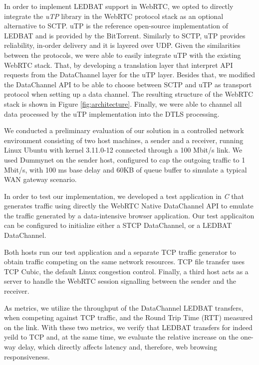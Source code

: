 \documentclass{sig-alternate}
\begin{document}
In order to implement LEDBAT support in WebRTC, we opted to directly integrate the
\textit{uTP} library \cite{utp-repo} in the WebRTC protocol stack as an optional
alternative to SCTP. uTP is the reference open-source implementation of LEDBAT and is
provided by the BitTorrent. Similarly to SCTP, uTP provides reliability, in-order delivery
and it is layered over UDP. Given the similarities between the protocols, we were able to
easily integrate uTP with the existing WebRTC stack. That, by developing a translation
layer that interpret API requests from the DataChannel layer for the uTP layer. Besides
that, we modified the DataChannel API to be able to choose between SCTP and uTP as
transport protocol when setting up a data channel. The resulting structure of the WebRTC
stack is shown in Figure \ref{fig:architecture}. Finally, we were able to channel all data
processed by the uTP implementation into the DTLS processing.


\label{sec:architecture}


We conducted a preliminary evaluation of our solution in a controlled network environment
consisting of two host machines, a sender and a receiver, running Linux Ubuntu with kernel
3.11.0-12 connected through a 100 Mbit/s link. We used Dummynet on the sender host,
configured to cap the outgoing traffic to 1 Mbit/s, with 100 ms base delay and 60KB of queue
buffer to simulate a typical WAN gateway scenario. 

In order to test our implementation, we developed a test application in \textit{C} that
generates traffic using directly the WebRTC Native DataChannel API to emulate the traffic
generated by a data-intensive browser application. Our test applicaiton can be configured
to initialize either a STCP DataChannel, or a LEDBAT DataChannel.

Both hosts run our test application and a separate TCP traffic generator to obtain traffic
competing on the same network resources. TCP file transfer uses TCP Cubic, the default
Linux congestion control. Finally, a third host acts as a server to handle the WebRTC
session signalling between the sender and the receiver.

As metrics, we utilize the throughput of the DataChannel LEDBAT transfers, when competing
against TCP traffic, and the Round Trip Time (RTT) measured on the link. With these two
metrics, we verify that LEDBAT transfers for indeed yeild to TCP and, at the same time, we
evaluate the relative increase on the one-way delay, which directly affects latency and,
therefore, web browsing responsiveness.
\end{document}

